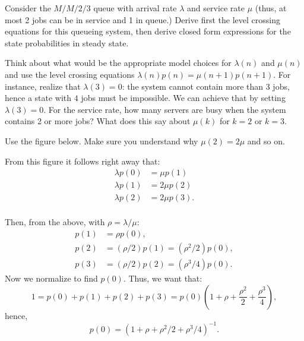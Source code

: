 \begin{exercise}{\faFlask}
Consider the $M/M/2/3$ queue with arrival rate $\lambda$ and
service rate $\mu$ (thus, at most 2 jobs can be in service and 1 in queue.)
 Derive first the level crossing equations for this queueing system, then  derive closed form expressions for the state    probabilities in steady state. 
  \begin{hint}
 Think about what would be the appropriate model choices for
   $\lambda(n)$ and $\mu(n)$ and use the level crossing equations
   $\lambda(n) p(n) = \mu(n+1)p(n+1)$.  For instance, realize that
   $\lambda(3)=0$: the system cannot contain more than 3 jobs, hence a
   state with $4$ jobs must be impossible. We can achieve that by
   setting $\lambda(3)=0$. For the service rate, how many servers are
   busy when the system contains 2 or more jobs?  What does this say
   about $\mu(k)$ for $k=2$ or $k=3$.
  \end{hint}
  \begin{solution}
 Use the figure below. Make sure you understand why $\mu(2)=2\mu$ and so on. 
    \begin{center}
      
    \end{center}

From this figure it follows right away that:
    \begin{align*}
   \lambda p(0) &= \mu p(1) \\
   \lambda p(1)  &= 2\mu p(2) \\
   \lambda p(2)  &= 2\mu p(3).\\
    \end{align*}

Then,  from the above, with $\rho=\lambda/\mu$: 
    \begin{align*}
      p(1) &= \rho p(0), \\
      p(2) &= (\rho/2) p(1) = (\rho^2/2) p(0), \\
      p(3) &= (\rho/2) p(2) = (\rho^3/4) p(0).
    \end{align*}
Now we normalize to find $p(0)$. Thus, we want that:
\begin{equation*}
  1 = p(0)+p(1)+p(2)+p(3) = p(0)\left(1 + \rho + \frac{\rho^2}2 + \frac{\rho^3}4\right),
\end{equation*}
hence,
\begin{equation*}
p(0) = (1+\rho + \rho^2/2 + \rho^3/4)^{-1}.
\end{equation*}
   \end{solution}
\end{exercise}


